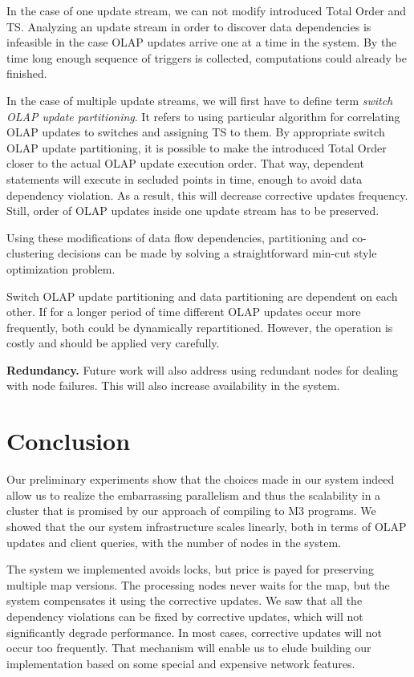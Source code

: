 \documentclass{sig-semester}
\def\OLAP{OLAP\xspace}
\def\EXORD{actual OLAP update execution order\xspace}
\begin{document}
In the case of one update stream, we can not modify introduced Total Order and TS. Analyzing an update stream in order to discover data dependencies is infeasible in the case \OLAP updates arrive one at a time in the system. By the time long enough sequence of triggers is collected, computations could already be finished.

In the case of multiple update streams, we will first have to define term \textit{switch \OLAP update partitioning}. It refers to using particular algorithm for correlating \OLAP updates to switches and assigning TS to them. By appropriate switch \OLAP update partitioning, it is possible to make the introduced Total Order closer to the \EXORD. That way, dependent statements will execute in secluded points in time, enough to avoid data dependency violation. As a result, this will decrease corrective updates frequency. Still, order of \OLAP updates inside one update stream has to be preserved.

Using these modifications of data flow dependencies, partitioning and co-clustering decisions can be made by solving a straightforward min-cut style optimization problem.

Switch \OLAP update partitioning and data partitioning are dependent on each other. If for a longer period of time different \OLAP updates occur more frequently, both could be dynamically repartitioned. However, the operation is costly and should be applied very carefully.

\textbf{Redundancy.} Future work will also address using redundant nodes for dealing with node failures. This will also increase availability in the system.

\section{Conclusion}
\label{sec:Conclusion}
\vspace{2mm}

Our preliminary experiments show that the choices made in our
system indeed allow us to realize the embarrassing parallelism and
thus the scalability in a cluster that is promised by our approach of
compiling to M3 programs.  We showed that the our system infrastructure scales linearly, both in terms of \OLAP updates and client queries, with the number of nodes in the system.

The system we implemented avoids locks, but price is payed for preserving multiple map versions. The processing nodes never waits for the map, but the system compensates it using the corrective updates. We saw that all the dependency violations can be fixed by corrective updates, which will not significantly degrade performance. In most cases, corrective updates will not occur too frequently. That mechanism will enable us to elude building our implementation based on some special and expensive network features.

{


}

\newpage
\end{document}
